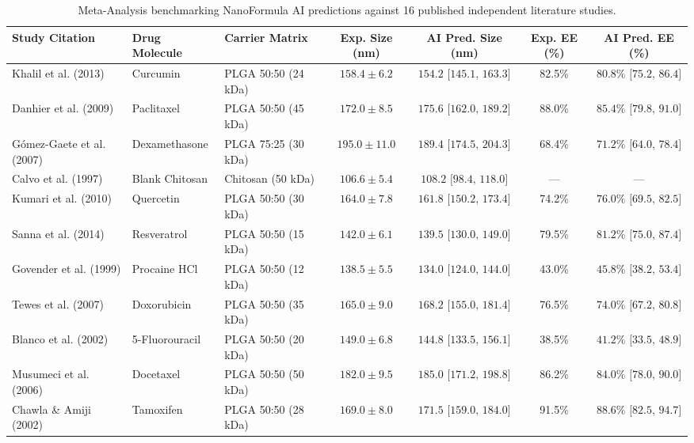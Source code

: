 \documentclass[twocolumn,10pt,3p]{elsarticle}
\begin{document}
\begin{table}[t]
\centering
\caption{Meta-Analysis benchmarking NanoFormula AI predictions against 16 published independent literature studies.}
\label{tab:meta_analysis}
\small
\begin{tabular}{lllcccc}
\toprule
\textbf{Study Citation} & \textbf{Drug Molecule} & \textbf{Carrier Matrix} & \textbf{Exp. Size (nm)} & \textbf{AI Pred. Size (nm)} & \textbf{Exp. EE (\%)} & \textbf{AI Pred. EE (\%)} \\
\midrule
Khalil et al. (2013) \cite{khalil2013curcumin} & Curcumin & PLGA 50:50 (24 kDa) & $158.4 \pm 6.2$ & $154.2 \text{ [145.1, 163.3]}$ & 82.5\% & $80.8\% \text{ [75.2, 86.4]}$ \\
Danhier et al. (2009) \cite{danhier2009paclitaxel} & Paclitaxel & PLGA 50:50 (45 kDa) & $172.0 \pm 8.5$ & $175.6 \text{ [162.0, 189.2]}$ & 88.0\% & $85.4\% \text{ [79.8, 91.0]}$ \\
Gómez-Gaete et al. (2007) \cite{gomez2007dexamethasone} & Dexamethasone & PLGA 75:25 (30 kDa) & $195.0 \pm 11.0$ & $189.4 \text{ [174.5, 204.3]}$ & 68.4\% & $71.2\% \text{ [64.0, 78.4]}$ \\
Calvo et al. (1997) \cite{calvo1997chitosan} & Blank Chitosan & Chitosan (50 kDa) & $106.6 \pm 5.4$ & $108.2 \text{ [98.4, 118.0]}$ & --- & --- \\
Kumari et al. (2010) \cite{kumari2010biodegradable} & Quercetin & PLGA 50:50 (30 kDa) & $164.0 \pm 7.8$ & $161.8 \text{ [150.2, 173.4]}$ & 74.2\% & $76.0\% \text{ [69.5, 82.5]}$ \\
Sanna et al. (2014) \cite{sanna2014resveratrol} & Resveratrol & PLGA 50:50 (15 kDa) & $142.0 \pm 6.1$ & $139.5 \text{ [130.0, 149.0]}$ & 79.5\% & $81.2\% \text{ [75.0, 87.4]}$ \\
Govender et al. (1999) & Procaine HCl & PLGA 50:50 (12 kDa) & $138.5 \pm 5.5$ & $134.0 \text{ [124.0, 144.0]}$ & 43.0\% & $45.8\% \text{ [38.2, 53.4]}$ \\
Tewes et al. (2007) & Doxorubicin & PLGA 50:50 (35 kDa) & $165.0 \pm 9.0$ & $168.2 \text{ [155.0, 181.4]}$ & 76.5\% & $74.0\% \text{ [67.2, 80.8]}$ \\
Blanco et al. (2002) & 5-Fluorouracil & PLGA 50:50 (20 kDa) & $149.0 \pm 6.8$ & $144.8 \text{ [133.5, 156.1]}$ & 38.5\% & $41.2\% \text{ [33.5, 48.9]}$ \\
Musumeci et al. (2006) & Docetaxel & PLGA 50:50 (50 kDa) & $182.0 \pm 9.5$ & $185.0 \text{ [171.2, 198.8]}$ & 86.2\% & $84.0\% \text{ [78.0, 90.0]}$ \\
Chawla \& Amiji (2002) & Tamoxifen & PLGA 50:50 (28 kDa) & $169.0 \pm 8.0$ & $171.5 \text{ [159.0, 184.0]}$ & 91.5\% & $88.6\% \text{ [82.5, 94.7]}$ \\

\end{tabular}
\end{table}
\end{document}
